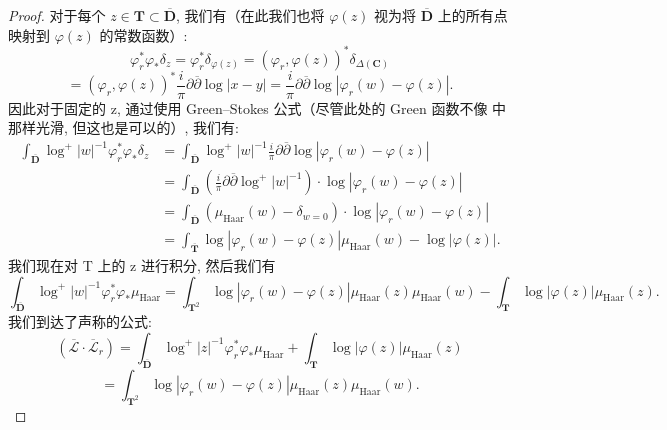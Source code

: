 \begin{proof}
对于每个 \(z \in \mathbf{T} \subset \overline{\mathbf{D}}\), 
我们有（在此我们也将 \(\varphi(z)\) 视为将 \(\overline{\mathbf{D}}\) 上的所有点映射到 \(\varphi(z)\) 的常数函数）:
\[ \varphi_r^* \varphi_* \delta_z = \varphi_r^* \delta_{\varphi(z)} = (\varphi_r, \varphi(z))^* \delta_{\Delta(\mathbf{C})} \]
\[ = (\varphi_r, \varphi(z))^* \frac{i}{\pi} \partial \overline{\partial} \log |x - y| = \frac{i}{\pi} \partial \overline{\partial} \log |\varphi_r(w) - \varphi(z)|. \]
因此对于固定的 z, 通过使用 Green--Stokes 公式（尽管此处的 Green 函数不像 \cite{BC22} 中那样光滑, 但这也是可以的）, 我们有:
\[ \begin{split} \int_{\overline{\mathbf{D}}} \log^{+} |w|^{-1} \varphi_{r}^{*} \varphi_{*} \delta_{z} &= \int_{\overline{\mathbf{D}}} \log^{+} |w|^{-1} \frac{i}{\pi} \partial \overline{\partial} \log |\varphi_{r}(w) - \varphi(z)| \\ &= \int_{\overline{\mathbf{D}}} \left( \frac{i}{\pi} \partial \overline{\partial} \log^{+} |w|^{-1} \right) \cdot \log |\varphi_{r}(w) - \varphi(z)| \\ &= \int_{\overline{\mathbf{D}}} \left( \mu_{\text{Haar}}(w) - \delta_{w=0} \right) \cdot \log |\varphi_{r}(w) - \varphi(z)| \\ &= \int_{\overline{\mathbf{T}}} \log |\varphi_{r}(w) - \varphi(z)| \mu_{\text{Haar}}(w) - \log |\varphi(z)|. \end{split} \]
我们现在对 T 上的 z 进行积分, 然后我们有
\[ \int_{\overline{\mathbf{D}}} \log^{+}|w|^{-1} \varphi_{r}^{*} \varphi_{*} \mu_{\text{Haar}} = \int_{\mathbf{T}^{2}} \log |\varphi_{r}(w) - \varphi(z)| \mu_{\text{Haar}}(z) \mu_{\text{Haar}}(w) - \int_{\mathbf{T}} \log |\varphi(z)| \mu_{\text{Haar}}(z). \]
我们到达了声称的公式:
\[ (\overline{\mathcal{L}} \cdot \overline{\mathcal{L}}_r) = \int_{\overline{\mathbf{D}}} \log^+ |z|^{-1} \varphi_r^* \varphi_* \mu_{\text{Haar}} + \int_{\mathbf{T}} \log |\varphi(z)| \mu_{\text{Haar}}(z) \]
\[ = \int_{\mathbf{T}^2} \log |\varphi_r(w) - \varphi(z)| \mu_{\text{Haar}}(z) \mu_{\text{Haar}}(w). \]
\end{proof}

